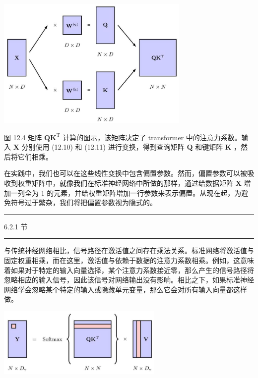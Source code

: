 \documentclass[10pt]{report}
\newcommand{\HRule}{\begin{center}\rule{0.9\linewidth}{0.2mm}\end{center}}
\begin{document}
\begin{center}
\includegraphics[max width=0.7\textwidth]{images/0194e279-9b28-703a-88f4-c3ac21e2010d_384_583_344_903_617_0.jpg}
\end{center}
\hspace*{3em} 

图 12.4 矩阵 \({\mathbf{{QK}}}^{\mathrm{T}}\) 计算的图示，该矩阵决定了 transformer 中的注意力系数。输入 \(\mathbf{X}\) 分别使用 (12.10) 和 (12.11) 进行变换，得到查询矩阵 \(\mathbf{Q}\) 和键矩阵 \(\mathbf{K}\) ，然后将它们相乘。

在实践中，我们也可以在这些线性变换中包含偏置参数。然而，偏置参数可以被吸收到权重矩阵中，就像我们在标准神经网络中所做的那样，通过给数据矩阵 \(\mathbf{X}\) 增加一列全为 1 的元素，并给权重矩阵增加一行参数来表示偏置。从现在起，为避免符号过于繁杂，我们将把偏置参数视为隐式的。

\HRule

6.2.1 节

\HRule

与传统神经网络相比，信号路径在激活值之间存在乘法关系。标准网络将激活值与固定权重相乘，而在这里，激活值与依赖于数据的注意力系数相乘。例如，这意味着如果对于特定的输入向量选择，某个注意力系数接近零，那么产生的信号路径将忽略相应的输入信号，因此该信号对网络输出没有影响。相比之下，如果标准神经网络学会忽略某个特定的输入或隐藏单元变量，那么它会对所有输入向量都这样做。

\begin{center}
\includegraphics[max width=0.6\textwidth]{images/0194e279-9b28-703a-88f4-c3ac21e2010d_384_776_1657_770_324_0.jpg}
\end{center}
\hspace*{3em} 
\end{document}
